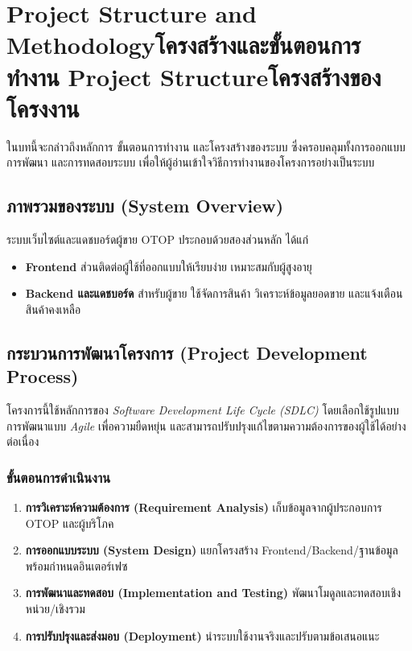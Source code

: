 \chapter{\ifproject%
\ifenglish Project Structure and Methodology\else โครงสร้างและขั้นตอนการทำงาน\fi
\else%
\ifenglish Project Structure\else โครงสร้างของโครงงาน\fi
\fi
}

ในบทนี้จะกล่าวถึงหลักการ ขั้นตอนการทำงาน และโครงสร้างของระบบ
ซึ่งครอบคลุมทั้งการออกแบบ การพัฒนา และการทดสอบระบบ \cite{pressman2014}
เพื่อให้ผู้อ่านเข้าใจวิธีการทำงานของโครงการอย่างเป็นระบบ

\section{ภาพรวมของระบบ (System Overview)}
ระบบเว็บไซต์และแดชบอร์ดผู้ขาย OTOP ประกอบด้วยสองส่วนหลัก ได้แก่ \cite{ecommerce2019}
\begin{itemize}
  \item \textbf{Frontend} ส่วนติดต่อผู้ใช้ที่ออกแบบให้เรียบง่าย เหมาะสมกับผู้สูงอายุ
  \item \textbf{Backend และแดชบอร์ด} สำหรับผู้ขาย ใช้จัดการสินค้า วิเคราะห์ข้อมูลยอดขาย และแจ้งเตือนสินค้าคงเหลือ
\end{itemize}

\section{กระบวนการพัฒนาโครงการ (Project Development Process)}
โครงการนี้ใช้หลักการของ \textit{Software Development Life Cycle (SDLC)} \cite{pressman2014}
โดยเลือกใช้รูปแบบการพัฒนาแบบ \textit{Agile} เพื่อความยืดหยุ่น \cite{pressman2014}
และสามารถปรับปรุงแก้ไขตามความต้องการของผู้ใช้ได้อย่างต่อเนื่อง

\subsection{ขั้นตอนการดำเนินงาน}
\begin{enumerate}
  \item \textbf{การวิเคราะห์ความต้องการ (Requirement Analysis)} เก็บข้อมูลจากผู้ประกอบการ OTOP และผู้บริโภค \cite{otop2020}
  \item \textbf{การออกแบบระบบ (System Design)} แยกโครงสร้าง Frontend/Backend/ฐานข้อมูล พร้อมกำหนดอินเตอร์เฟซ \cite{pressman2014}
  \item \textbf{การพัฒนาและทดสอบ (Implementation and Testing)} พัฒนาโมดูลและทดสอบเชิงหน่วย/เชิงรวม \cite{pressman2014}
  \item \textbf{การปรับปรุงและส่งมอบ (Deployment)} นำระบบใช้งานจริงและปรับตามข้อเสนอแนะ \cite{ecommerce2019}
\end{enumerate}

